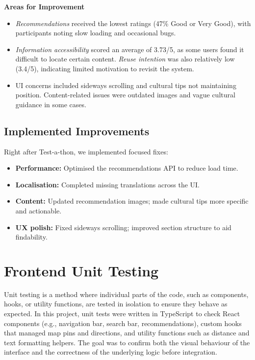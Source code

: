 \textbf{Areas for Improvement}
\begin{itemize}\setlength\itemsep{0.3em}
    \item \emph{Recommendations} received the lowest ratings (47\% Good or Very Good), with participants noting slow loading and occasional bugs. 
    \item \emph{Information accessibility} scored an average of 3.73/5, as some users found it difficult to locate certain content. \emph{Reuse intention} was also relatively low (3.4/5), indicating limited motivation to revisit the system. 
    \item UI concerns included sideways scrolling and cultural tips not maintaining position. Content-related issues were outdated images and vague cultural guidance in some cases. 
\end{itemize}


\subsection{Implemented Improvements}

\noindent Right after Test-a-thon, we implemented focused fixes:
\begin{itemize}\setlength\itemsep{0.2em}
  \item \textbf{Performance:} Optimised the recommendations API to reduce load time. 
  \item \textbf{Localisation:} Completed missing translations across the UI. 
  \item \textbf{Content:} Updated recommendation images; made cultural tips more specific and actionable. 
  \item \textbf{UX polish:} Fixed sideways scrolling; improved section structure to aid findability. 
\end{itemize}

\section{Frontend Unit Testing}
\label{sec:fe-unit-tests}

Unit testing is a method where individual parts of the code, such as components, hooks, or utility functions, 
are tested in isolation to ensure they behave as expected. 
In this project, unit tests were written in TypeScript to check React components (e.g., navigation bar, search bar, recommendations), 
custom hooks that managed map pins and directions, and utility functions such as distance and text formatting helpers. 
The goal was to confirm both the visual behaviour of the interface and the correctness of the underlying logic before integration.


